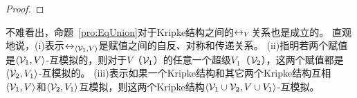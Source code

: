 \begin{proof}
%	
%	
\end{proof}

不难看出，命题~\ref{pro:EqUnion}对于Kripke结构之间的$\leftrightarrow_V$关系也是成立的。
直观地说，(i)表示$\leftrightarrow_{{\langle{{\cal V}_1,V}\rangle}}$是赋值之间的自反、对称和传递关系。
(ii)指明若两个赋值是${{\langle{{\cal V}_1,V}\rangle}}$-互模拟的，则对于$V$（${\cal V}_1$）的任意一个超级$V_1$（${\cal V}_2$），这两个赋值都是${{\langle{{\cal V}_2,V_1}\rangle}}$-互模拟的。
(iii)表示如果一个Kripke结构和其它两个Kripke结构互相${{\langle{{\cal V}_1,V}\rangle}}$和${{\langle{{\cal V}_2,V_1}\rangle}}$互模拟，则这两个Kripke结构${{\langle{{\cal V}_1 \cup {\cal V}_2,V \cup V_1}\rangle}}$-互模拟。%

